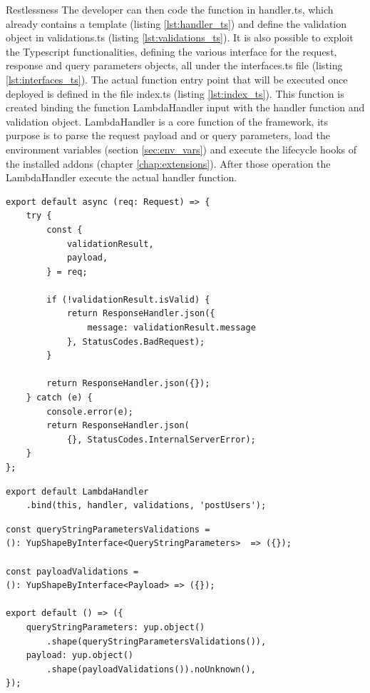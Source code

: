 \begin{chapter}{Restlessness}
    The developer can then code the function in handler.ts, which already contains a
    template (listing \ref{lst:handler_ts}) and define the validation object in
    validations.ts (listing \ref{lst:validations_ts}).
    It is also possible to exploit the Typescript functionalities, defining the various
    interface for the request, response and query parameters objects, all under the
    interfaces.ts file (listing \ref{lst:interfaces_ts}).
    The actual function entry point that will be executed once deployed is defined
    in the file index.ts (listing \ref{lst:index_ts}). This function is created binding
    the function LambdaHandler input with the handler function and validation object.
    LambdaHandler is a core function of the framework, its purpose is to parse the
    request payload and or query parameters, load the environment variables (section
    \ref{sec:env_vars}) and execute the lifecycle hooks of the installed addons (chapter
    \ref{chap:extensions}).
    After those operation the LambdaHandler execute the actual handler function.

    \begin{lstlisting}[caption=handler.ts content, label={lst:handler_ts}]
export default async (req: Request) => {
    try {
        const {
            validationResult,
            payload,
        } = req;

        if (!validationResult.isValid) {
            return ResponseHandler.json({
                message: validationResult.message
            }, StatusCodes.BadRequest);
        }

        return ResponseHandler.json({});
    } catch (e) {
        console.error(e);
        return ResponseHandler.json(
            {}, StatusCodes.InternalServerError);
    }
};
    \end{lstlisting}

    \begin{lstlisting}[caption=index.ts content, label={lst:index_ts}]
export default LambdaHandler
    .bind(this, handler, validations, 'postUsers');
    \end{lstlisting}

    \begin{lstlisting}[caption=validations.ts content, label={lst:validations_ts}]
const queryStringParametersValidations =
(): YupShapeByInterface<QueryStringParameters>  => ({});

const payloadValidations =
(): YupShapeByInterface<Payload> => ({});

export default () => ({
    queryStringParameters: yup.object()
        .shape(queryStringParametersValidations()),
    payload: yup.object()
        .shape(payloadValidations()).noUnknown(),
});
    \end{lstlisting}


\end{chapter}
